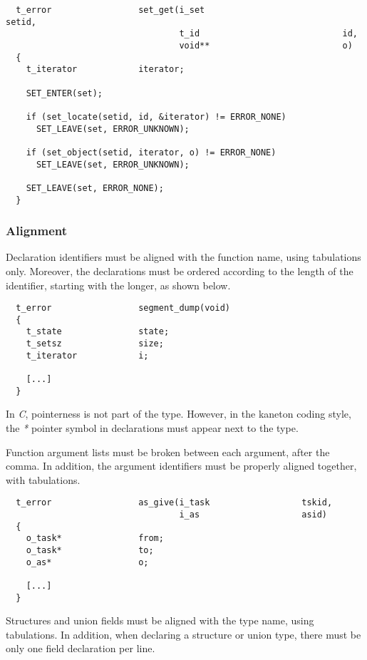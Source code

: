 \begin{verbatim}
  t_error                 set_get(i_set                           setid,
                                  t_id                            id,
                                  void**                          o)
  {
    t_iterator            iterator;

    SET_ENTER(set);

    if (set_locate(setid, id, &iterator) != ERROR_NONE)
      SET_LEAVE(set, ERROR_UNKNOWN);

    if (set_object(setid, iterator, o) != ERROR_NONE)
      SET_LEAVE(set, ERROR_UNKNOWN);

    SET_LEAVE(set, ERROR_NONE);
  }
\end{verbatim}


\subsubsection{Alignment}

Declaration identifiers must be aligned with the function name, using
tabulations only. Moreover, the declarations must be ordered according
to the length of the identifier, starting with the longer, as shown below.

\begin{verbatim}
  t_error                 segment_dump(void)
  {
    t_state               state;
    t_setsz               size;
    t_iterator            i;

    [...]
  }
\end{verbatim}

In \textit{C}, pointerness is not part of the type. However, in the kaneton
coding style, the \textit{*} pointer symbol in declarations must appear next
to the type.

Function argument lists must be broken between each argument, after the
comma. In addition, the argument identifiers must be properly aligned
together, with tabulations.

\begin{verbatim}
  t_error                 as_give(i_task                  tskid,
                                  i_as                    asid)
  {
    o_task*               from;
    o_task*               to;
    o_as*                 o;

    [...]
  }
\end{verbatim}

Structures and union fields must be aligned with the type name, using
tabulations. In addition, when declaring a structure or union type, there
must be only one field declaration per line.

